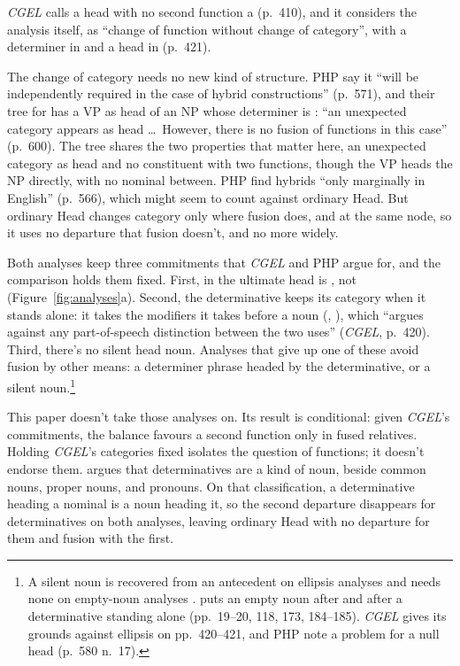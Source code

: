 \textit{CGEL} calls a head with no second function a  (p.~410), and it considers the analysis itself, as \enquote{change of function without change of category}, with  a determiner in  and a head in  (p.~421).

The change of category needs no new kind of structure. PHP say it \enquote{will be independently required in the case of hybrid constructions} (p.~571), and their tree for  has a VP as head of an NP whose determiner is : \enquote{an unexpected category appears as head \ldots\ However, there is no fusion of functions in this case} (p.~600). The tree shares the two properties that matter here, an unexpected category as head and no constituent with two functions, though the VP heads the NP directly, with no nominal between. PHP find hybrids \enquote{only marginally in English} (p.~566), which might seem to count against ordinary Head. But ordinary Head changes category only where fusion does, and at the same node, so it uses no departure that fusion doesn't, and no more widely.

Both analyses keep three commitments that \textit{CGEL} and PHP argue for, and the comparison holds them fixed. First, in  the ultimate head is , not  (Figure~\ref{fig:analyses}a). Second, the determinative keeps its category when it stands alone: it takes the modifiers it takes before a noun (, ), which \enquote{argues against any part-of-speech distinction between the two uses} (\textit{CGEL}, p.~420). Third, there's no silent head noun. Analyses that give up one of these avoid fusion by other means: a determiner phrase headed by the determinative, or a silent noun.\footnote{A silent noun is recovered from an antecedent on ellipsis analyses \citep{lobeck1995ellipsis} and needs none on empty-noun analyses \citep{kester1996adjectival,saab2019nominal,kayne2007several,aarts2024fused}. \textcite{wu2021exocentric} puts an empty noun after  and after a determinative standing alone (pp.~19--20, 118, 173, 184--185). \textit{CGEL} gives its grounds against ellipsis on pp.~420--421, and PHP note a problem for a null head (p.~580 n.~17).}

This paper doesn't take those analyses on. Its result is conditional: given \textit{CGEL}'s commitments, the balance favours a second function only in fused relatives. Holding \textit{CGEL}'s categories fixed isolates the question of functions; it doesn't endorse them. \textcite{reynolds2026determinativesnouns} argues that determinatives are a kind of noun, beside common nouns, proper nouns, and pronouns. On that classification, a determinative heading a nominal is a noun heading it, so the second departure disappears for determinatives on both analyses, leaving ordinary Head with no departure for them and fusion with the first.

